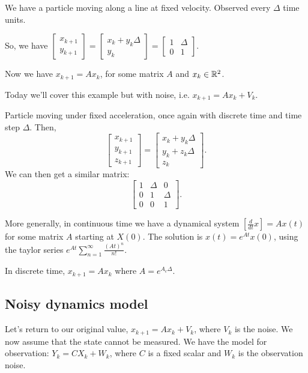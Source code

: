 \documentclass{article}
\begin{document}
\begin{example}
	We have a particle moving along a line at fixed velocity. Observed every $\Delta$ time units. 

	So, we have $\begin{bmatrix}x_{k+1} \\ y_{k+1}\end{bmatrix} = \begin{bmatrix} x_k + y_k \Delta \\ y_k \end{bmatrix} = \begin{bmatrix}1 & \Delta \\ 0 & 1 \end{bmatrix}$.

	Now we have $x_{k+1} = Ax_k$, for some matrix $A$ and $x_k \in \mathbb R^2$.
\end{example}

Today we'll cover this example but with noise, i.e. $x_{k+1} = Ax_{k} + V_k$.

\begin{example}
	Particle moving under fixed acceleration, once again with discrete time and time step $\Delta$. Then, 
	\[\begin{bmatrix}x_{k+1} \\ y_{k+1} \\ z_{k+1} \end{bmatrix} = \begin{bmatrix} x_{k} + y_{k} \Delta \\ y_{k} + z_{k} \Delta \\ z_k \end{bmatrix}.\] We can then get a similar matrix: \[\begin{bmatrix} 1 & \Delta & 0 \\ 0 & 1 & \Delta \\ 0 & 0 & 1 \end{bmatrix}.\]
\end{example}

More generally, in continuous time we have a dynamical system $\left[\frac{d}{dt} x\right] = A x(t)$ for some matrix $A$ starting at $X(0)$. 
The solution is $x(t) = e^{At} x(0)$, using the taylor series $e^{At} \sum_{n = 1}^\infty \frac{(At)^n}{n!}$.

In discrete time, $x_{k+1} = Ax_k$ where $A = e^{A_c \Delta}$.

\subsection{Noisy dynamics model}
Let's return to our original value, 
$x_{k+1} = Ax_{k} + V_{k}$, where $V_k$ is the noise. We now assume that the state cannot be measured. 
We have the model for observation: $Y_k = CX_k + W_k$, where $C$ is a fixed scalar and $W_k$ is the observation noise.
\end{document}

